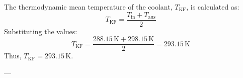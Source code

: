 The thermodynamic mean temperature of the coolant, \( T_{\text{KF}} \), is calculated as:  
\[
T_{\text{KF}} = \frac{T_{\text{in}} + T_{\text{aus}}}{2}
\]  
Substituting the values:  
\[
T_{\text{KF}} = \frac{288.15 \, \text{K} + 298.15 \, \text{K}}{2} = 293.15 \, \text{K}
\]  
Thus, \( T_{\text{KF}} = 293.15 \, \text{K} \).

---